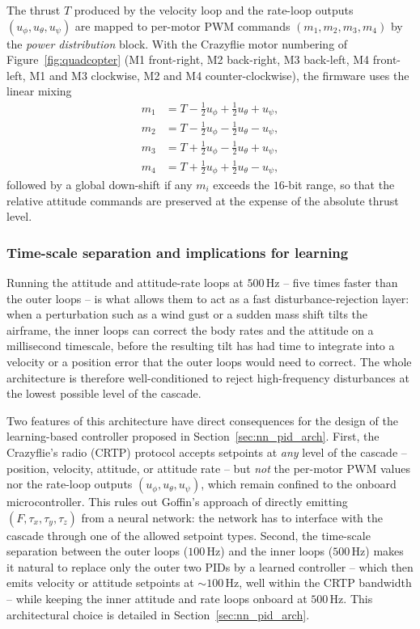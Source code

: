 \documentclass[11pt,a4paper]{article}
\theoremstyle{remark}
\numberwithin{equation}{section}
\begin{document}
The thrust $T$ produced by the velocity loop and the rate-loop outputs
$(u_\phi, u_\theta, u_\psi)$ are mapped to per-motor PWM commands $(m_1, m_2, m_3, m_4)$
by the \emph{power distribution} block. With the Crazyflie motor numbering of
Figure~\ref{fig:quadcopter} (M1 front-right, M2 back-right, M3 back-left, M4 front-left,
M1 and M3 clockwise, M2 and M4 counter-clockwise), the firmware uses the linear mixing
\begin{equation}
\begin{aligned}
m_1 &= T - \tfrac{1}{2} u_\phi + \tfrac{1}{2} u_\theta + u_\psi, \\
m_2 &= T - \tfrac{1}{2} u_\phi - \tfrac{1}{2} u_\theta - u_\psi, \\
m_3 &= T + \tfrac{1}{2} u_\phi - \tfrac{1}{2} u_\theta + u_\psi, \\
m_4 &= T + \tfrac{1}{2} u_\phi + \tfrac{1}{2} u_\theta - u_\psi,
\end{aligned}
\label{eq:power_distribution}
\end{equation}
followed by a global down-shift if any $m_i$ exceeds the $16$-bit range, so that the
relative attitude commands are preserved at the expense of the absolute thrust level.

\subsubsection*{Time-scale separation and implications for learning}

Running the attitude and attitude-rate loops at $500\,\mathrm{Hz}$ -- five times faster
than the outer loops -- is what allows them to act as a fast disturbance-rejection layer:
when a perturbation such as a wind gust or a sudden mass shift tilts the airframe, the
inner loops can correct the body rates and the attitude on a millisecond timescale, before
the resulting tilt has had time to integrate into a velocity or a position error that the
outer loops would need to correct. The whole architecture is therefore well-conditioned to
reject high-frequency disturbances at the lowest possible level of the cascade.

Two features of this architecture have direct consequences for the design of the
learning-based controller proposed in Section~\ref{sec:nn_pid_arch}. First, the
Crazyflie's radio (CRTP) protocol accepts setpoints at \emph{any} level of the cascade --
position, velocity, attitude, or attitude rate -- but \emph{not} the per-motor PWM values
nor the rate-loop outputs $(u_\phi, u_\theta, u_\psi)$, which remain confined to the
onboard microcontroller. This rules out Goffin's approach of directly emitting
$(F, \tau_x, \tau_y, \tau_z)$ from a neural network: the network has to interface with the
cascade through one of the allowed setpoint types. Second, the time-scale separation
between the outer loops ($100\,\mathrm{Hz}$) and the inner loops ($500\,\mathrm{Hz}$)
makes it natural to replace only the outer two PIDs by a learned controller -- which then
emits velocity or attitude setpoints at $\sim 100\,\mathrm{Hz}$, well within the CRTP
bandwidth -- while keeping the inner attitude and rate loops onboard at
$500\,\mathrm{Hz}$. This architectural choice is detailed in Section~\ref{sec:nn_pid_arch}.
\end{document}
